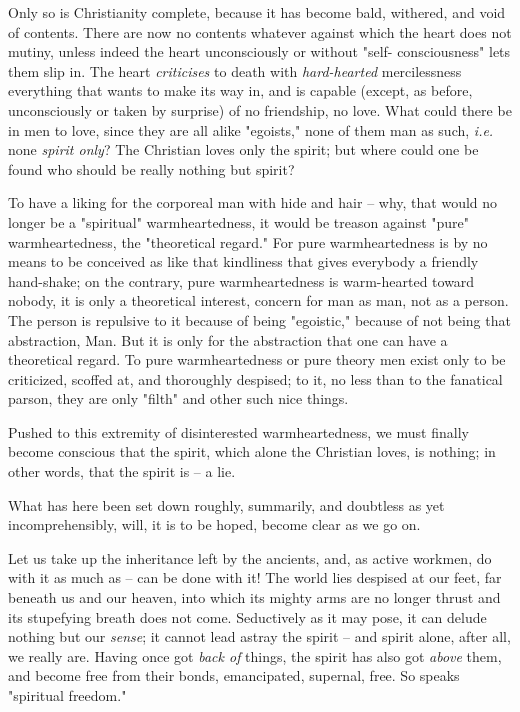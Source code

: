\documentclass[a4paper]{book}
\begin{document}
Only so is Christianity complete, because it has become bald, withered, and 
void of contents. There are now no contents whatever against which the heart 
does not mutiny, unless indeed the heart unconsciously or without "{}self- 
consciousness"{} lets them slip in. The heart \textit{criticises} to death 
with \textit{hard-hearted} mercilessness everything that wants to make its way 
in, and is capable (except, as before, unconsciously or taken by surprise) of 
no friendship, no love. What could there be in men to love, since they are all 
alike "{}egoists,"{} none of them man as such, \textit{i.e.} none 
\textit{spirit only}? The Christian loves only the spirit; but where could one 
be found who should be really nothing but spirit?

To have a liking for the corporeal man with hide and hair -- why, that would 
no longer be a "{}spiritual"{} warmheartedness, it would be treason against 
"{}pure"{} warmheartedness, the "{}theoretical regard."{} For pure 
warmheartedness is by no means to be conceived as like that kindliness that 
gives everybody a friendly hand-shake; on the contrary, pure warmheartedness 
is warm-hearted toward nobody, it is only a theoretical interest, concern for 
man as man, not as a person. The person is repulsive to it because of being 
"{}egoistic,"{} because of not being that abstraction, Man. But it is only for 
the abstraction that one can have a theoretical regard. To pure 
warmheartedness or pure theory men exist only to be criticized, scoffed at, 
and thoroughly despised; to it, no less than to the fanatical parson, they are 
only "{}filth"{} and other such nice things.

Pushed to this extremity of disinterested warmheartedness, we must finally 
become conscious that the spirit, which alone the Christian loves, is nothing; 
in other words, that the spirit is -- a lie.

What has here been set down roughly, summarily, and doubtless as yet 
incomprehensibly, will, it is to be hoped, become clear as we go on.

Let us take up the inheritance left by the ancients, and, as active workmen, 
do with it as much as -- can be done with it! The world lies despised at our 
feet, far beneath us and our heaven, into which its mighty arms are no longer 
thrust and its stupefying breath does not come. Seductively as it may pose, it 
can delude nothing but our \textit{sense}; it cannot lead astray the spirit -- 
and spirit alone, after all, we really are. Having once got \textit{back of} 
things, the spirit has also got \textit{above} them, and become free from 
their bonds, emancipated, supernal, free. So speaks "{}spiritual freedom."{}
\end{document}
